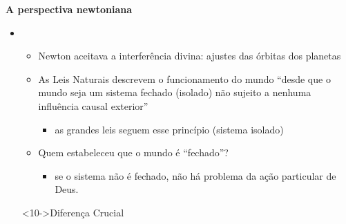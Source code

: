 \begin{frame}{\textbf{A perspectiva newtoniana}}
 \begin{itemize}
		\item<2->[$\bullet$]  \onslide<3->{$\not\Rightarrow$} 
		 \onslide<4->{\textcolor{NordYellow}{teologia da não interferência divina}}
			\begin{itemize}
				\item<5-> Newton aceitava a interferência divina: ajustes das órbitas dos planetas
				\item<6-> As Leis Naturais descrevem o funcionamento do mundo 
				 ``desde que o mundo seja um \textcolor{NordRed}{sistema fechado} (isolado) 
					não sujeito a nenhuma influência causal exterior''
					\begin{itemize}
						\item<7->[-] as grandes leis seguem esse princípio (sistema isolado) 
					\end{itemize}
				\item<8-> Quem estabeleceu que o mundo é ``fechado''?
				 \begin{itemize}
						\item<9->[-] se o sistema \textcolor{NordOrange}{não} é fechado, não há 
							problema da \textcolor{NordOrange}{ação particular} de Deus.
					\end{itemize}
			\end{itemize}
			
			\centering
			\begin{minipage}{\textwidth}
			\begin{block}<10->{Diferença Crucial}
			\centering
			 \onslide<11->{\textcolor{NordBrightCyan}{Dizer como as coisas são sempre}}\\
					\onslide<12->{$\neq$}\\ 
				\onslide<13->{\textcolor{NordCyan}{Dizer como as coisas são quando nenhum agente 
					exterior ao universo age.}}
			\end{block}
			\end{minipage}
	\end{itemize}
	
\end{frame}

